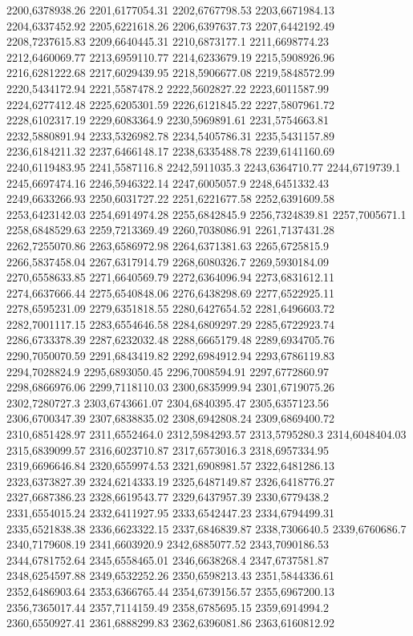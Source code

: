 2200,6378938.26
2201,6177054.31
2202,6767798.53
2203,6671984.13
2204,6337452.92
2205,6221618.26
2206,6397637.73
2207,6442192.49
2208,7237615.83
2209,6640445.31
2210,6873177.1
2211,6698774.23
2212,6460069.77
2213,6959110.77
2214,6233679.19
2215,5908926.96
2216,6281222.68
2217,6029439.95
2218,5906677.08
2219,5848572.99
2220,5434172.94
2221,5587478.2
2222,5602827.22
2223,6011587.99
2224,6277412.48
2225,6205301.59
2226,6121845.22
2227,5807961.72
2228,6102317.19
2229,6083364.9
2230,5969891.61
2231,5754663.81
2232,5880891.94
2233,5326982.78
2234,5405786.31
2235,5431157.89
2236,6184211.32
2237,6466148.17
2238,6335488.78
2239,6141160.69
2240,6119483.95
2241,5587116.8
2242,5911035.3
2243,6364710.77
2244,6719739.1
2245,6697474.16
2246,5946322.14
2247,6005057.9
2248,6451332.43
2249,6633266.93
2250,6031727.22
2251,6221677.58
2252,6391609.58
2253,6423142.03
2254,6914974.28
2255,6842845.9
2256,7324839.81
2257,7005671.1
2258,6848529.63
2259,7213369.49
2260,7038086.91
2261,7137431.28
2262,7255070.86
2263,6586972.98
2264,6371381.63
2265,6725815.9
2266,5837458.04
2267,6317914.79
2268,6080326.7
2269,5930184.09
2270,6558633.85
2271,6640569.79
2272,6364096.94
2273,6831612.11
2274,6637666.44
2275,6540848.06
2276,6438298.69
2277,6522925.11
2278,6595231.09
2279,6351818.55
2280,6427654.52
2281,6496603.72
2282,7001117.15
2283,6554646.58
2284,6809297.29
2285,6722923.74
2286,6733378.39
2287,6232032.48
2288,6665179.48
2289,6934705.76
2290,7050070.59
2291,6843419.82
2292,6984912.94
2293,6786119.83
2294,7028824.9
2295,6893050.45
2296,7008594.91
2297,6772860.97
2298,6866976.06
2299,7118110.03
2300,6835999.94
2301,6719075.26
2302,7280727.3
2303,6743661.07
2304,6840395.47
2305,6357123.56
2306,6700347.39
2307,6838835.02
2308,6942808.24
2309,6869400.72
2310,6851428.97
2311,6552464.0
2312,5984293.57
2313,5795280.3
2314,6048404.03
2315,6839099.57
2316,6023710.87
2317,6573016.3
2318,6957334.95
2319,6696646.84
2320,6559974.53
2321,6908981.57
2322,6481286.13
2323,6373827.39
2324,6214333.19
2325,6487149.87
2326,6418776.27
2327,6687386.23
2328,6619543.77
2329,6437957.39
2330,6779438.2
2331,6554015.24
2332,6411927.95
2333,6542447.23
2334,6794499.31
2335,6521838.38
2336,6623322.15
2337,6846839.87
2338,7306640.5
2339,6760686.7
2340,7179608.19
2341,6603920.9
2342,6885077.52
2343,7090186.53
2344,6781752.64
2345,6558465.01
2346,6638268.4
2347,6737581.87
2348,6254597.88
2349,6532252.26
2350,6598213.43
2351,5844336.61
2352,6486903.64
2353,6366765.44
2354,6739156.57
2355,6967200.13
2356,7365017.44
2357,7114159.49
2358,6785695.15
2359,6914994.2
2360,6550927.41
2361,6888299.83
2362,6396081.86
2363,6160812.92
